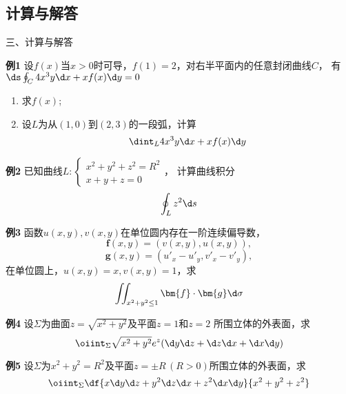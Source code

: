 \subsection{计算与解答}

\begin{frame}{三、计算与解答}
	\linespread{1.2}
	\begin{exampleblock}{{\bf 例1}\hfill}
		设$f(x)$当$x>0$时可导，$f(1)=2$，对右半平面内的任意封闭曲线$C$，
		有$\ds\oint_C4x^3y\d x+xf(x)\d y=0$
		\begin{enumerate}
		  \item 求$f(x)$;
		  \item 设$L$为从$(1,0)$到$(2,3)$的一段弧，计算
		  $$\dint_L4x^3y\d x+xf(x)\d y$$
		\end{enumerate}
	\end{exampleblock}
\end{frame}

\begin{frame}
	\linespread{1.2}
	\begin{exampleblock}{{\bf 例2}\hfill}
		已知曲线$L:\left\{\begin{array}{l}
			x^2+y^2+z^2=R^2\\ x+y+z=0
		\end{array}\right.$，
		计算曲线积分
		$$\oint_Lz^2\d s$$
	\end{exampleblock}
\end{frame}

\begin{frame}
	\linespread{1.2}
	\begin{exampleblock}{{\bf 例3}\hfill}
		函数$u(x,y),v(x,y)$在单位圆内存在一阶连续偏导数，
		$$\bm{f}(x,y)=(v(x,y),u(x,y)),$$
		$$\bm{g}(x,y)=\left(u'_x-u'_y,v'_x-v'_y\right),$$
		在单位圆上，$u(x,y)=x,v(x,y)=1$，求
		$$\iint_{x^2+y^2\leq 1}\bm{f}\cdot\bm{g}\d\sigma$$
	\end{exampleblock}
\end{frame}

\begin{frame}
	\linespread{1.2}
	\begin{exampleblock}{{\bf 例4}\hfill}
		设$\Sigma$为曲面$z=\sqrt{x^2+y^2}$及平面$z=1$和$z=2$
		所围立体的外表面，求
		$$\oiint_{\Sigma}\sqrt{x^2+y^2}e^z(\d y\d z+\d z\d x+\d x\d y)$$
	\end{exampleblock}
\end{frame}

\begin{frame}
	\linespread{1.2}
	\begin{exampleblock}{{\bf 例5}\hfill}
		设$\Sigma$为$x^2+y^2=R^2$及平面$z=\pm R\,(R>0)$所围立体的外表面，求
		$$\oiint_{\Sigma}\df{x\d y\d z+y^2\d z\d x+z^2\d x\d y}{x^2+y^2+z^2}$$
	\end{exampleblock}
\end{frame}

